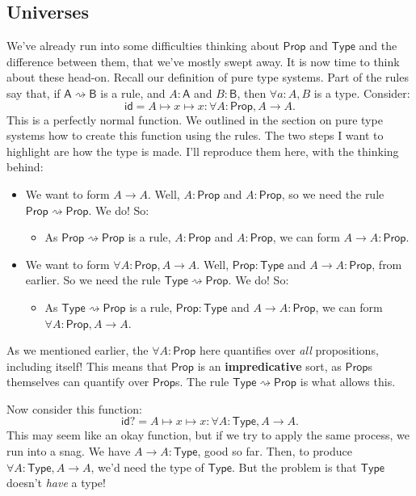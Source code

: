 \documentclass[11pt,paper=letter]{scrartcl}
\renewcommand{\sf}{\mathsf}
\newcommand{\prop}{\mathsf{Prop}}
\newcommand{\type}{\mathsf{Type}}
\newcommand{\toto}{\rightsquigarrow}
\begin{document}
\subsection{Universes}

We've already run into some difficulties thinking about $\prop$ and $\type$ and the difference between them, that we've mostly swept away. It is now time to think about these head-on. Recall our definition of pure type systems. Part of the rules say that, if $\sf{A} \toto \sf{B}$ is a rule, and $A : \sf{A}$ and $B: \sf{B}$, then $\forall a: A, B$ is a type. Consider:
\[
\sf{id} = A \mapsto x \mapsto x : \forall A: \prop, A \to A.
\]
This is a perfectly normal function. We outlined in the section on pure type systems how to create this function using the rules. The two steps I want to highlight are how the type is made. I'll reproduce them here, with the thinking behind:
\begin{itemize}
\item We want to form $A \to A$. Well, $A: \prop$ and $A: \prop$, so we need the rule $\prop \toto \prop$. We do! So:
\begin{itemize}
  \item As $\prop \toto \prop$ is a rule, $A: \prop$ and $A: \prop$, we can form $A \to A: \prop$.
\end{itemize}
\item We want to form $\forall A: \prop, A \to A$. Well, $\prop: \type$ and $A \to A: \prop$, from earlier. So we need the rule $\type \toto \prop$. We do! So:
\begin{itemize}
  \item As $\type \toto \prop$ is a rule, $\prop: \type$ and $A \to A: \prop$, we can form $\forall A: \prop, A \to A$.
\end{itemize}
\end{itemize}

As we mentioned earlier, the $\forall A: \prop$ here quantifies over \emph{all} propositions, including itself! This means that $\prop$ is an \textbf{impredicative} sort, as $\prop$s themselves can quantify over $\prop$s. The rule $\type \toto \prop$ is what allows this.

Now consider this function: \[
\sf{id?} = A \mapsto x \mapsto x : \forall A: \type, A \to A.
\]
This may seem like an okay function, but if we try to apply the same process, we run into a snag. We have $A \to A: \type$, good so far. Then, to produce $\forall A: \type, A \to A$, we'd need the type of $\type$. But the problem is that $\type$ doesn't \emph{have} a type!
\end{document}
